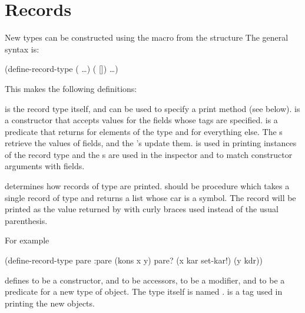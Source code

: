 \section{Records}
\label{records}

New types can be constructed using the  macro
 from the  structure
The general syntax is:
\begin{example}
(define-record-type  
  (  \ldots)
  (  [])
  \ldots)
\end{example}
This makes the following definitions:
\begin{protos}
\end{protos}
\noindent
{} is the record type itself, and can be used to
 specify a print method (see below).
 is a constructor that accepts values
 for the fields whose tags are specified.
 is a predicate that returns  for
 elements of the type and  for everything else.
The s retrieve the values of fields,
 and the 's update them.
 is used in printing instances of the record type and
 the s are used in the inspector and to match
 constructor arguments with fields.

\begin{protos}
\end{protos}
\noindent
{} determines how
 records of type  are printed.
 should be procedure which takes a single
 record of type  and returns a list whose car is
 a symbol.
The record will be printed as the value returned by 
 with curly braces used instead of the usual parenthesis.

For example
\begin{example}
(define-record-type pare :pare
  (kons x y)
  pare?
  (x kar set-kar!)
  (y kdr))
\end{example}
 defines  to be a constructor,  and  to be
 accessors,  to be a modifier, and  to be a predicate
 for a new type of object.
The type itself is named .
 is a tag used in printing the new objects.


